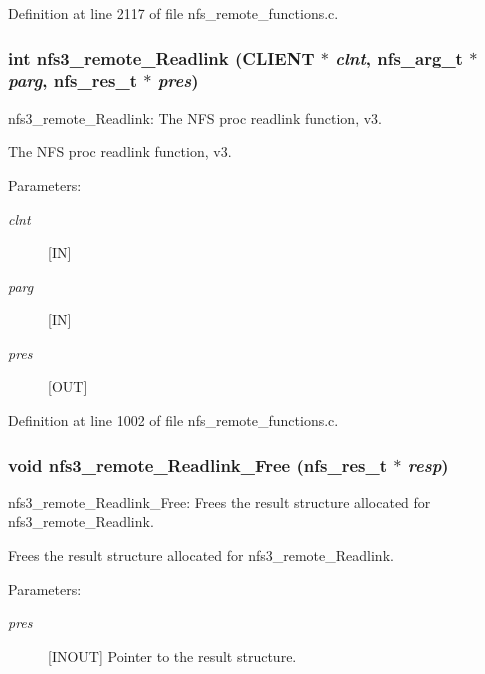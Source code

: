 Definition at line 2117 of file nfs\_\-remote\_\-functions.c.
\subsubsection[{nfs3\_\-remote\_\-Readlink}]{\setlength{\rightskip}{0pt plus 5cm}int nfs3\_\-remote\_\-Readlink (CLIENT $\ast$ {\em clnt}, \/  nfs\_\-arg\_\-t $\ast$ {\em parg}, \/  nfs\_\-res\_\-t $\ast$ {\em pres})}\label{group__NFSprocs_ge4a1980500759e95ffcf102bfb340b09}


nfs3\_\-remote\_\-Readlink: The NFS proc readlink function, v3.

The NFS proc readlink function, v3.

\begin{Desc}
\item[Parameters:]
\begin{description}
\item[{\em clnt}][IN] \item[{\em parg}][IN] \item[{\em pres}][OUT] \end{description}
\end{Desc}


Definition at line 1002 of file nfs\_\-remote\_\-functions.c.
\subsubsection[{nfs3\_\-remote\_\-Readlink\_\-Free}]{\setlength{\rightskip}{0pt plus 5cm}void nfs3\_\-remote\_\-Readlink\_\-Free (nfs\_\-res\_\-t $\ast$ {\em resp})}\label{group__NFSprocs_g5d7d2dd373ccace7e64731e90aa6104e}


nfs3\_\-remote\_\-Readlink\_\-Free: Frees the result structure allocated for nfs3\_\-remote\_\-Readlink.

Frees the result structure allocated for nfs3\_\-remote\_\-Readlink.

\begin{Desc}
\item[Parameters:]
\begin{description}
\item[{\em pres}][INOUT] Pointer to the result structure. \end{description}
\end{Desc}


